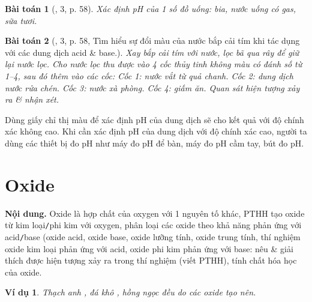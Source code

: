 \documentclass{article}
\newtheorem{baitoan}{Bài toán}
\newtheorem{vidu}{Ví dụ}
\begin{document}
\begin{baitoan}[\cite{SGK_KHTN_8_Canh_Dieu}, 3, p. 58]
	Xác định pH của 1 số đồ uống: bia, nước uống có gas, sữa tươi.
\end{baitoan}

\begin{baitoan}[\cite{SGK_KHTN_8_Canh_Dieu}, 3, p. 58, Tìm hiểu sự đổi màu của nước bắp cải tím khi tác dụng với các dung dịch acid \& base.]
	Xay bắp cải tím với nước, lọc bã qua rây để giữ lại nước lọc. Cho nước lọc thu được vào 4 cốc thủy tinh không màu có đánh số từ 1--4, sau đó thêm vào các cốc: Cốc 1: nước vắt từ quả chanh. Cốc 2: dung dịch nước rửa chén. Cốc 3: nước xà phòng. Cốc 4: giấm ăn. Quan sát hiện tượng xảy ra \& nhận xét.
\end{baitoan}
Dùng giấy chỉ thị màu để xác định pH của dung dịch sẽ cho kết quả với độ chính xác không cao. Khi cần xác định pH của dung dịch với độ chính xác cao, người ta dùng các thiết bị đo pH như máy đo pH để bàn, máy đo pH cầm tay, bút đo pH.

\noindent{}


\section{Oxide}
\textsf{\textbf{Nội dung.} Oxide là hợp chất của oxygen với 1 nguyên tố khác, PTHH tạo oxide từ kim loại\texttt{/}phi kim với oxygen, phân loại các oxide theo khả năng phản ứng với acid\texttt{/}base (oxide acid, oxide base, oxide lưỡng tính, oxide trung tính, thí nghiệm oxide kim loại phản ứng với acid, oxide phi kim phản ứng với base: nêu \& giải thích được hiện tượng xảy ra trong thí nghiệm (viết PTHH), tính chất hóa học của oxide.}

\begin{vidu}
	Thạch anh \emph{}, đá khô \emph{}, hồng ngọc \emph{} đều do các oxide tạo nên.
\end{vidu}
\end{document}
